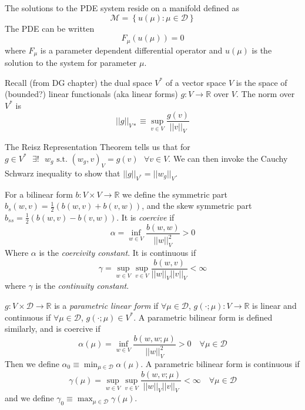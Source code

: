 The solutions to the PDE system reside on a manifold defined as 
\begin{equation}
\mathcal{M}= \left\lbrace u(\mu) : \mu \in \mathcal{D} \right\rbrace
\end{equation}
The PDE can be written 
\begin{equation}
F_\mu (u(\mu))=0
\end{equation}
where $F_{\mu}$ is a parameter dependent differential operator and $u(\mu)$ is the solution to the system for parameter $\mu$. 

Recall (from DG chapter) the dual space $V^*$ of a vector space $V$ is the space of (bounded?) linear functionals (aka linear forms) $g:V \rightarrow \mathbb{R}$ over $V$. The norm over $V^*$ is 
\[ || g ||_{V*} \equiv \sup_{v \in V} \frac{g(v)}{||v||_V} \]

The Reisz Representation Theorem tells us that for $g \in V^* \mbox{ } \exists! \mbox{ } w_g \mbox{ s.t. } (w_g, v)_V = g(v)\mbox{ } \forall v \in V$.  We can then invoke the Cauchy Schwarz inequality to show that $||g||_{V^*} = ||w_g||_V $.

For a bilinear form $b:V \times V \rightarrow \mathbb{R}$ we define the symmetric part $b_s (w,v)=\frac{1}{2}(b(w,v)+b(v,w))$, and the skew symmetric part $b_{ss}=\frac{1}{2}(b(w,v)-b(v,w))$. It is \textit{coercive} if 
\begin{equation}
\alpha = \inf_{w \in V} \frac{b(w,w)}{||w||^2_V}>0
\end{equation}
Where $\alpha$ is the \textit{coercivity constant}. It is continuous if 
\begin{equation}
\gamma = \sup_{w \in V}\sup_{v \in V} \frac{b(w,v)}{||w||_V ||v||_V}< \infty
\end{equation}
where $\gamma$ is the \textit{continuity constant}.

$g:V\times \mathcal{D}\rightarrow \mathbb{R}$ is a \textit{parametric linear form} if $\forall \mu \in \mathcal{D}$, $g(\cdot ; \mu):V \rightarrow \mathbb{R}$ is linear and continuous if $\forall \mu \in \mathcal{D}$, $g(\cdot ; \mu) \in V^*$. A parametric bilinear form is defined similarly, and is coercive if 
\begin{equation}
\alpha(\mu) = \inf_{w \in V} \frac{b(w,w;\mu)}{||w||^2_V}>0 \quad \forall \mu \in \mathcal{D}
\end{equation}
Then we define $\alpha_0 \equiv \min_{\mu \in \mathcal{D}} \alpha(\mu)$. A parametric bilinear form is continuous if 
\begin{equation}
\gamma(\mu) = \sup_{w \in V}\sup_{v \in V} \frac{b(w,v;\mu)}{||w||_V ||v||_V}< \infty \quad \forall \mu \in \mathcal{D}
\end{equation}
and we define $\gamma_0 \equiv \max_{\mu \in \mathcal{D}} \gamma(\mu)$.

